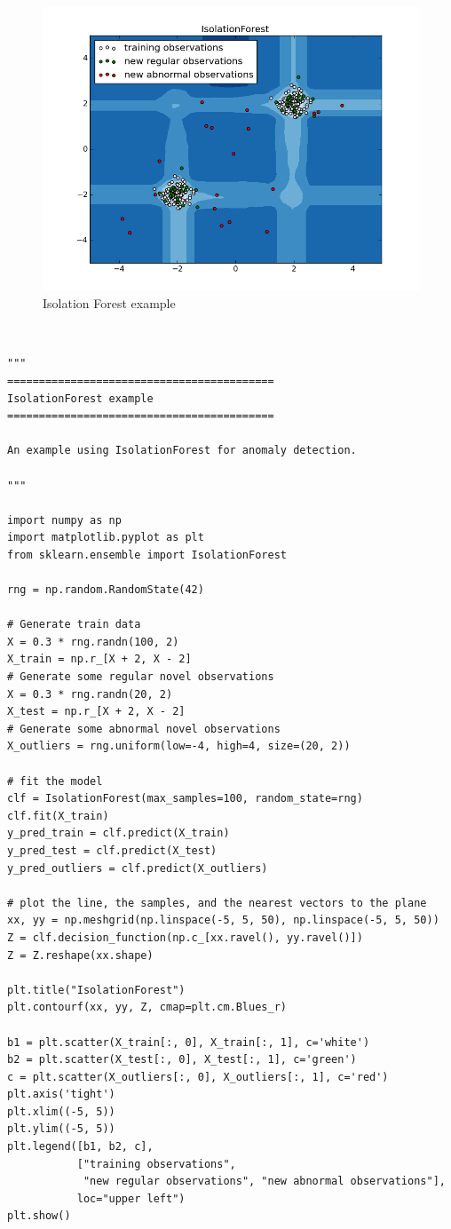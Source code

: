 \begin{figure}[!ht]
\centering
  \includegraphics[width=0.8\linewidth]{fig_source/iforest}
  \caption{Isolation Forest example}
  \label{fig:iforest}
\end{figure}
~\\
\begin{mdframed}[hidealllines=true, backgroundcolor=lightgray] 
\begin{verbatim}
"""
==========================================
IsolationForest example
==========================================

An example using IsolationForest for anomaly detection.

"""

import numpy as np
import matplotlib.pyplot as plt
from sklearn.ensemble import IsolationForest

rng = np.random.RandomState(42)

# Generate train data
X = 0.3 * rng.randn(100, 2)
X_train = np.r_[X + 2, X - 2]
# Generate some regular novel observations
X = 0.3 * rng.randn(20, 2)
X_test = np.r_[X + 2, X - 2]
# Generate some abnormal novel observations
X_outliers = rng.uniform(low=-4, high=4, size=(20, 2))

# fit the model
clf = IsolationForest(max_samples=100, random_state=rng)
clf.fit(X_train)
y_pred_train = clf.predict(X_train)
y_pred_test = clf.predict(X_test)
y_pred_outliers = clf.predict(X_outliers)

# plot the line, the samples, and the nearest vectors to the plane
xx, yy = np.meshgrid(np.linspace(-5, 5, 50), np.linspace(-5, 5, 50))
Z = clf.decision_function(np.c_[xx.ravel(), yy.ravel()])
Z = Z.reshape(xx.shape)

plt.title("IsolationForest")
plt.contourf(xx, yy, Z, cmap=plt.cm.Blues_r)

b1 = plt.scatter(X_train[:, 0], X_train[:, 1], c='white')
b2 = plt.scatter(X_test[:, 0], X_test[:, 1], c='green')
c = plt.scatter(X_outliers[:, 0], X_outliers[:, 1], c='red')
plt.axis('tight')
plt.xlim((-5, 5))
plt.ylim((-5, 5))
plt.legend([b1, b2, c],
           ["training observations",
            "new regular observations", "new abnormal observations"],
           loc="upper left")
plt.show()
\end{verbatim}
\end{mdframed}

